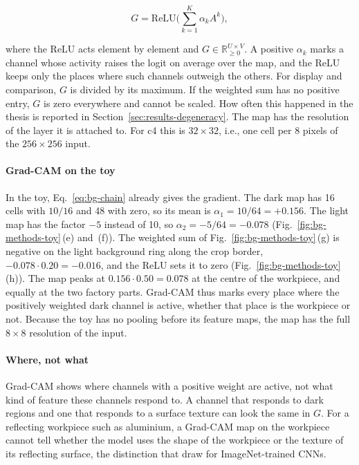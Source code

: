\begin{equation}
G = \mathrm{ReLU}\Big( \sum_{k=1}^{K} \alpha_k A^k \Big),
\label{eq:bg-gradcam-map}
\end{equation}

where the ReLU acts element by element and $G \in \mathbb{R}_{\ge 0}^{U \times V}$. A
positive $\alpha_k$ marks a channel whose activity raises the logit on average over the
map, and the ReLU keeps
only the places where such channels outweigh the others. For display and comparison,
$G$ is divided by its maximum. If the weighted sum has no positive entry, $G$ is zero
everywhere and cannot be scaled. How often this happened in the thesis is reported in
Section~\ref{sec:results-degeneracy}. The map has the resolution of the layer it is
attached to. For c4 this is $32 \times 32$, i.e., one cell per 8 pixels of the
$256 \times 256$ input.

\paragraph{Grad-CAM on the toy}
In the toy, Eq.~\eqref{eq:bg-chain} already gives the gradient. The dark map has 16
cells with $10/16$ and 48 with zero, so its mean is
$\alpha_1 = 10/64 = +0.156$. The light map has the factor $-5$ instead of 10, so
$\alpha_2 = -5/64 = -0.078$ (Fig.~\ref{fig:bg-methods-toy}\,(e) and~(f)). The weighted
sum of Fig.~\ref{fig:bg-methods-toy}\,(g) is negative on the light background ring along
the crop border, $-0.078 \cdot 0.20 = -0.016$, and the ReLU sets it to zero
(Fig.~\ref{fig:bg-methods-toy}\,(h)). The map peaks at $0.156 \cdot 0.50 = 0.078$ at the
centre of the workpiece, and equally at the two factory parts. Grad-CAM thus marks every
place where the positively weighted dark channel is active, whether that place is the
workpiece or not. Because the toy has no pooling before its feature maps, the map has
the full $8 \times 8$ resolution of the input.

\paragraph{Where, not what}
Grad-CAM shows where channels with a positive weight are active, not what kind of
feature these channels respond to. A channel that responds to dark regions and one that
responds to a surface texture can look the same in $G$. For a reflecting workpiece such
as aluminium, a Grad-CAM map on the workpiece cannot tell whether the model uses the shape of the workpiece or the texture of
its reflecting surface, the distinction that \citet{geirhos2019texture}
draw for ImageNet-trained CNNs.

